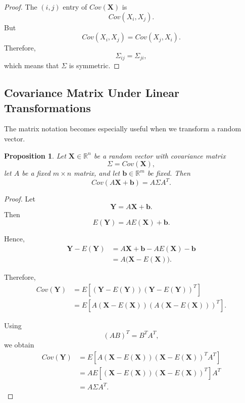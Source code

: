 \documentclass[11pt]{article}
\theoremstyle{definition}
\theoremstyle{plain}
\newtheorem{proposition}{Proposition}
\theoremstyle{remark}
\begin{document}
\begin{proof}
The $(i,j)$ entry of $Cov(\mathbf{X})$ is
\[
Cov(X_i,X_j).
\]
But
\[
Cov(X_i,X_j)=Cov(X_j,X_i).
\]
Therefore,
\[
\Sigma_{ij}=\Sigma_{ji},
\]
which means that $\Sigma$ is symmetric.
\end{proof}


\subsection*{Covariance Matrix Under Linear Transformations}

The matrix notation becomes especially useful when we transform a
random vector.

\begin{proposition}
Let $\mathbf{X}\in\mathbb{R}^n$ be a random vector with covariance
matrix
\[
\Sigma=Cov(\mathbf{X}),
\]
let $A$ be a fixed $m\times n$ matrix, and let
$\mathbf{b}\in\mathbb{R}^m$ be fixed. Then
\[
{
Cov(A\mathbf{X}+\mathbf{b})
=
A\Sigma A^T.
}
\]
\end{proposition}

\begin{proof}
Let
\[
\mathbf{Y}=A\mathbf{X}+\mathbf{b}.
\]
Then
\[
E(\mathbf{Y})
=
AE(\mathbf{X})+\mathbf{b}.
\]

Hence,
\begin{align*}
\mathbf{Y}-E(\mathbf{Y})
&=
A\mathbf{X}+\mathbf{b}
-
AE(\mathbf{X})
-
\mathbf{b}
\\
&=
A\bigl(\mathbf{X}-E(\mathbf{X})\bigr).
\end{align*}

Therefore,
\begin{align*}
Cov(\mathbf{Y})
&=
E\left[
(\mathbf{Y}-E(\mathbf{Y}))
(\mathbf{Y}-E(\mathbf{Y}))^T
\right]
\\
&=
E\left[
A(\mathbf{X}-E(\mathbf{X}))
\left(
A(\mathbf{X}-E(\mathbf{X}))
\right)^T
\right].
\end{align*}

Using
\[
(AB)^T=B^TA^T,
\]
we obtain
\begin{align*}
Cov(\mathbf{Y})
&=
E\left[
A(\mathbf{X}-E(\mathbf{X}))
(\mathbf{X}-E(\mathbf{X}))^T A^T
\right]
\\
&=
A
E\left[
(\mathbf{X}-E(\mathbf{X}))
(\mathbf{X}-E(\mathbf{X}))^T
\right]
A^T
\\
&=
A\Sigma A^T.
\end{align*}
\end{proof}
\end{document}
